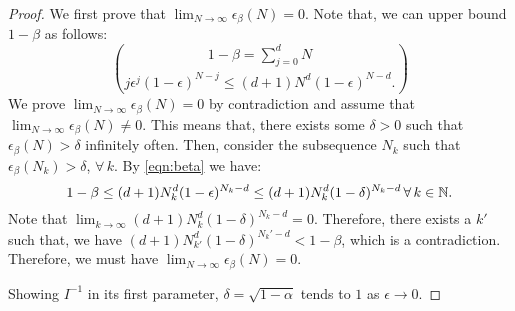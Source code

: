 \begin{proof} 
We first prove that $\lim_{N \to \infty} \epsilon_\beta(N) = 0$. Note that, we can upper bound $1-\beta$ as follows:
\begin{equation}\label{eqn:beta}1-\beta = \sum_{j=0}^d {N}\choose{j} \epsilon^j (1-\epsilon)^{N-j} \leq  (d+1)N^d (1-\epsilon)^{N-d}.
\end{equation}
We prove $\lim_{N \to \infty} \epsilon_\beta(N) = 0$ by contradiction and assume that $\lim_{N \to \infty} \epsilon_\beta(N) \not= 0$. This means that, there exists some $\delta > 0$ such that $\epsilon_\beta(N) > \delta$ infinitely often. Then, consider the subsequence $N_k$ such that $\epsilon_\beta(N_k) > \delta$, $\forall\, k.$ By \eqref{eqn:beta} we have:
\begin{equation*}1-\beta \leq (d+1)N_k^d (1-\epsilon)^{N_k-d} \leq (d+1)N_k^d (1-\delta)^{N_k-d}\, \forall\,k \in \mathbb{N}. 
\end{equation*}
Note that $\lim_{k \to \infty}(d+1)N_k^d (1-\delta)^{N_k-d} = 0.$ Therefore, there exists a $k'$ such that, we have $ (d+1)N_{k'}^d (1-\delta)^{N_k'-d} < 1 -\beta$, which is a contradiction. Therefore, we must have  $\lim_{N \to \infty} \epsilon_\beta(N) = 0$.

Showing $I^{-1}$ in its first parameter, $\delta = \sqrt{1-\alpha}$ tends to $1$ as $\epsilon \to 0$.

\end{proof}

